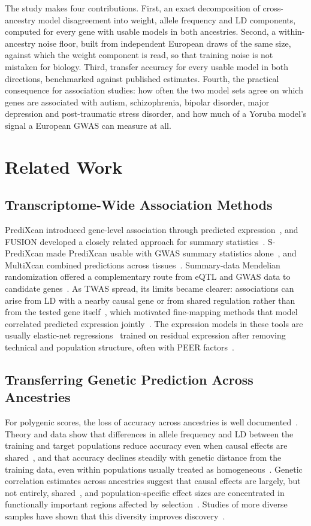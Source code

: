 \documentclass[conference]{IEEEtran}
\begin{document}
The study makes four contributions. First, an exact decomposition of cross-ancestry model disagreement into weight, allele frequency and LD components, computed for every gene with usable models in both ancestries. Second, a within-ancestry noise floor, built from independent European draws of the same size, against which the weight component is read, so that training noise is not mistaken for biology. Third, transfer accuracy for every usable model in both directions, benchmarked against published estimates. Fourth, the practical consequence for association studies: how often the two model sets agree on which genes are associated with autism, schizophrenia, bipolar disorder, major depression and post-traumatic stress disorder, and how much of a Yoruba model's signal a European GWAS can measure at all.

\section{Related Work}

\subsection{Transcriptome-Wide Association Methods}
PrediXcan introduced gene-level association through predicted expression~\cite{gamazon2015}, and FUSION developed a closely related approach for summary statistics~\cite{gusev2016}. S-PrediXcan made PrediXcan usable with GWAS summary statistics alone~\cite{barbeira2018}, and MultiXcan combined predictions across tissues~\cite{barbeira2019}. Summary-data Mendelian randomization offered a complementary route from eQTL and GWAS data to candidate genes~\cite{zhu2016}. As TWAS spread, its limits became clearer: associations can arise from LD with a nearby causal gene or from shared regulation rather than from the tested gene itself~\cite{wainberg2019}, which motivated fine-mapping methods that model correlated predicted expression jointly~\cite{mancuso2019}. The expression models in these tools are usually elastic-net regressions~\cite{zou2005,friedman2010} trained on residual expression after removing technical and population structure, often with PEER factors~\cite{stegle2012}.

\subsection{Transferring Genetic Prediction Across Ancestries}
For polygenic scores, the loss of accuracy across ancestries is well documented~\cite{martin2017,martin2019,duncan2019}. Theory and data show that differences in allele frequency and LD between the training and target populations reduce accuracy even when causal effects are shared~\cite{wang2020}, and that accuracy declines steadily with genetic distance from the training data, even within populations usually treated as homogeneous~\cite{ding2023}. Genetic correlation estimates across ancestries suggest that causal effects are largely, but not entirely, shared~\cite{brown2016}, and population-specific effect sizes are concentrated in functionally important regions affected by selection~\cite{shi2021}. Studies of more diverse samples have shown that this diversity improves discovery~\cite{wojcik2019}.
\end{document}
